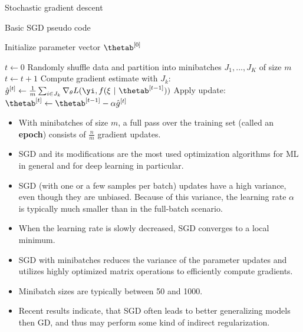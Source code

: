 \begin{vbframe}{Stochastic gradient descent}

  \begin{algorithm}[H]
  \footnotesize
    \caption{Basic SGD pseudo code}
    \begin{algorithmic}[1]
    \State Initialize parameter vector $\thetab^{[0]}$ 
    
    \State $t \leftarrow 0$
    \State Randomly shuffle data and partition into minibatches $J_1, ..., J_K$ of size $m$
      \State $t \leftarrow t + 1$ 
      \State Compute gradient estimate with $J_k$: $\hat{g}^{[t]} \leftarrow \frac{1}{m} \sum_{i \in J_k} \nabla_\theta L(\yi, f(\xi ~|~ \thetab^{[t-1]})) $
      \State Apply update: $\thetab^{[t]} \leftarrow \thetab^{[t-1]} - \alpha \hat{g}^{[t]}$
      
      \EndFor
    
        
      \EndWhile
    \end{algorithmic}
  \end{algorithm}
  
\framebreak

\vspace*{0.5cm}
  \begin{itemize}
    \item With minibatches of size $m$, a full pass over the training set (called an \textbf{epoch}) consists of $\frac{n}{m}$ gradient updates.
    \item SGD and its modifications are the most used optimization algorithms for ML in general and for deep learning in particular.
    \item SGD (with one or a few samples per batch) updates have a high variance, even though they are unbiased. 
      Because of this variance, the learning rate $\alpha$ is typically much smaller than in the full-batch scenario.

\framebreak 

\vspace*{0.5cm}

    \item When the learning rate is slowly decreased, SGD converges to a local minimum.
    \item SGD with minibatches reduces the variance of the parameter updates and utilizes highly optimized matrix operations to efficiently compute gradients.
    \item Minibatch sizes are typically between 50 and 1000.
    \item Recent results indicate, that SGD often leads to better generalizing models then GD, and thus may perform some kind of indirect regularization.
  \end{itemize}
\end{vbframe}

